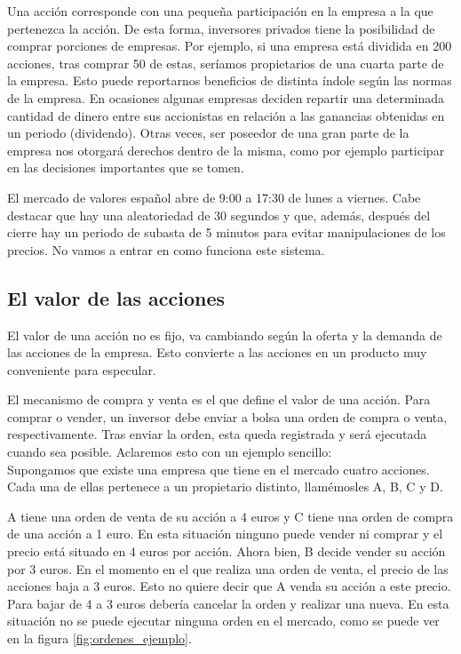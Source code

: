 \documentclass[12pt,a4paper]{article}
\begin{document}
		Una acci\'on corresponde con una pequeña participaci\'on en la empresa a la que pertenezca la acci\'on. De esta forma, inversores privados tiene la posibilidad de comprar porciones de empresas. Por ejemplo, si una empresa est\'a dividida en 200 acciones, tras comprar 50 de estas, ser\'iamos propietarios de una cuarta parte de la empresa. Esto puede reportarnos beneficios de distinta \'indole seg\'un las normas de la empresa. En ocasiones algunas empresas deciden repartir una determinada cantidad de dinero entre sus accionistas en relaci\'on a las ganancias obtenidas en un periodo (dividendo). Otras veces, ser poseedor de una gran parte de la empresa nos otorgar\'a derechos dentro de la misma, como por ejemplo participar en las decisiones importantes que se tomen.
		
		El mercado de valores espa\~nol abre de 9:00 a 17:30 de lunes a viernes. Cabe destacar que hay una aleatoriedad de 30 segundos y que, además, despu\'es del cierre hay un periodo de subasta de 5 minutos para evitar manipulaciones de los precios. No vamos a entrar en como funciona este sistema.
		
		\subsection{El valor de las acciones}
		
		El valor de una acci\'on no es fijo, va cambiando seg\'un la oferta y la demanda de las acciones de la empresa. Esto convierte a las acciones en un producto muy conveniente para especular.
		
		El mecanismo de compra y venta es el que define el valor de una acci\'on. Para comprar o vender, un inversor debe enviar a bolsa una orden de compra o venta, respectivamente. Tras enviar la orden, esta queda registrada y ser\'a ejecutada cuando sea posible. Aclaremos esto con un ejemplo sencillo:\\
		
		Supongamos que existe una empresa que tiene en el mercado cuatro acciones. Cada una de ellas pertenece a un propietario distinto, llam\'emosles A, B, C y D. 
		
		A tiene una orden de venta de su acci\'on a 4 euros y C tiene una orden de compra de una acci\'on a 1 euro. En esta situaci\'on ninguno puede vender ni comprar y el precio est\'a situado en 4 euros por acci\'on. Ahora bien, B decide vender su acci\'on por 3 euros. En el momento en el que realiza una orden de venta, el precio de las acciones baja a 3 euros. Esto no quiere decir que A venda su acci\'on a este precio. Para bajar de 4 a 3 euros deber\'ia cancelar la orden y realizar una nueva. En esta situaci\'on no se puede ejecutar ninguna orden en el mercado, como se puede ver en la figura \ref{fig:ordenes_ejemplo}.
		
\end{document}
